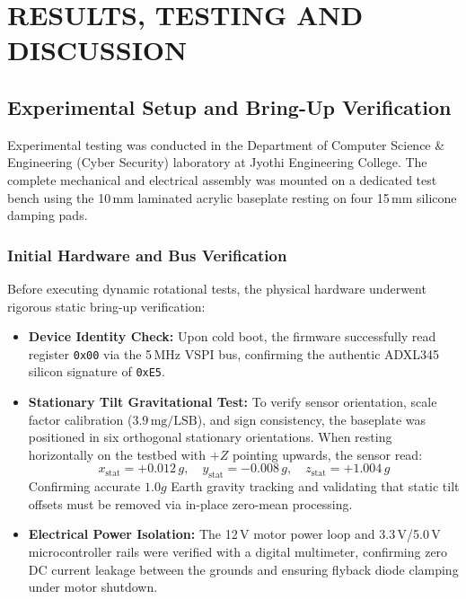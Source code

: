 \chapter{RESULTS, TESTING AND DISCUSSION}
\label{ch:results_discussion}

\section{Experimental Setup and Bring-Up Verification}
Experimental testing was conducted in the Department of Computer Science \& Engineering (Cyber Security) laboratory at Jyothi Engineering College. The complete mechanical and electrical assembly was mounted on a dedicated test bench using the 10\,mm laminated acrylic baseplate resting on four 15\,mm silicone damping pads.

\subsection{Initial Hardware and Bus Verification}
Before executing dynamic rotational tests, the physical hardware underwent rigorous static bring-up verification:
\begin{itemize}
    \item \textbf{Device Identity Check:} Upon cold boot, the firmware successfully read register \texttt{0x00} via the 5\,MHz VSPI bus, confirming the authentic ADXL345 silicon signature of \texttt{0xE5}.
    \item \textbf{Stationary Tilt Gravitational Test:} To verify sensor orientation, scale factor calibration ($3.9\,\text{mg/LSB}$), and sign consistency, the baseplate was positioned in six orthogonal stationary orientations. When resting horizontally on the testbed with $+Z$ pointing upwards, the sensor read:
    \begin{equation}
    x_{\mathrm{stat}} = +0.012\,g, \quad y_{\mathrm{stat}} = -0.008\,g, \quad z_{\mathrm{stat}} = +1.004\,g
    \end{equation}
    Confirming accurate $1.0g$ Earth gravity tracking and validating that static tilt offsets must be removed via in-place zero-mean processing.
    \item \textbf{Electrical Power Isolation:} The 12\,V motor power loop and 3.3\,V/5.0\,V microcontroller rails were verified with a digital multimeter, confirming zero DC current leakage between the grounds and ensuring flyback diode clamping under motor shutdown.
\end{itemize}

